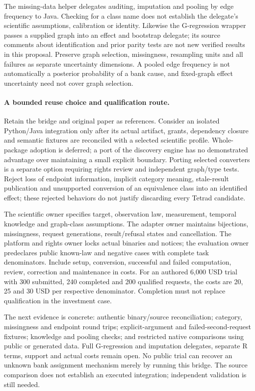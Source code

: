 The missing-data helper delegates auditing, imputation and pooling by edge
frequency to Java. Checking for a class name does not establish the delegate's
scientific assumptions, calibration or identity. Likewise the G-regression
wrapper passes a supplied graph into an effect and bootstrap delegate; its
source comments about identification and prior parity tests are not new
verified results in this proposal. Preserve graph selection, missingness,
resampling units and all failures as separate uncertainty dimensions. A pooled
edge frequency is not automatically a posterior probability of a bank cause,
and fixed-graph effect uncertainty need not cover graph selection.
\citep{exec24_pytetrad_source}

\paragraph{A bounded reuse choice and qualification route.}
Retain the bridge and original paper as references. Consider an isolated
Python/Java integration only after its actual artifact, grants, dependency
closure and semantic fixtures are reconciled with a selected scientific
profile. Whole-package adoption is deferred; a port of the discovery engine
has no demonstrated advantage over maintaining a small explicit boundary.
Porting selected converters is a separate option requiring rights review and
independent graph/type tests. Reject loss of endpoint information, implicit
category meaning, stale-result publication and unsupported conversion of an
equivalence class into an identified effect; these rejected behaviors do not
justify discarding every Tetrad candidate.~\citep{exec24_pytetrad_choice}

The scientific owner specifies target, observation law, measurement, temporal
knowledge and graph-class assumptions. The adapter owner maintains bijections,
missingness, request generations, result/refusal states and cancellation. The
platform and rights owner locks actual binaries and notices; the evaluation
owner predeclares public known-law and negative cases with complete task
denominators. Include setup, conversion, successful and failed computation,
review, correction and maintenance in costs. For an authored 6,000 USD trial
with 300 submitted, 240 completed and 200 qualified requests, the costs are
20, 25 and 30 USD per respective denominator. Completion must not replace
qualification in the investment case.~\citep{exec24_pytetrad_choice}

The next evidence is concrete: authentic binary/source reconciliation;
category, missingness and endpoint round trips; explicit-argument and
failed-second-request fixtures; knowledge and pooling checks; and restricted
native comparisons using public or generated data. Full G-regression and
imputation delegates, separate R terms, support and actual costs remain open.
No public trial can recover an unknown bank assignment mechanism merely by
running this bridge. The source comparison does not establish an executed integration; independent validation is still needed.
